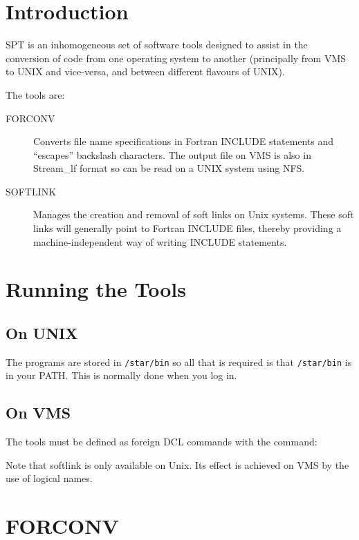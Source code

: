 \documentclass[11pt,nolof]{starlink}
\begin{document}
\scfrontmatter

\section{Introduction}

SPT is an inhomogeneous set of
software tools designed to assist in the
conversion of code from one operating system to another (principally from
VMS to UNIX and vice-versa, and between different flavours of UNIX).

The tools are:
\begin{description}
\item[FORCONV] Converts file name specifications in Fortran INCLUDE statements
and ``escapes'' backslash characters. The output file on VMS is also in
Stream\_lf format so can be read on a UNIX system using NFS.
\item[SOFTLINK] Manages the creation and removal of soft links on Unix systems.
These soft links will generally point to Fortran INCLUDE files, thereby
providing a machine-independent way of writing INCLUDE statements.
\end{description}

\section{Running the Tools}

\subsection{On UNIX}

The programs are stored in \texttt{/star/bin} so all that is required is
that \texttt{/star/bin} is in your PATH. This is normally done when you log in.
\subsection{On VMS}
The tools must be defined as foreign DCL commands with the command:
Note that softlink is only available on Unix. Its effect is achieved on VMS by
the use of logical names.

\section{FORCONV}
\end{document}

